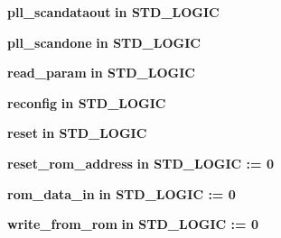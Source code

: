 \begin{DoxyCompactItemize}
\item 
{\bf pll\+\_\+scandataout}  {\bfseries {\bfseries \textcolor{keywordflow}{in}\textcolor{vhdlchar}{ }}} {\bfseries \textcolor{comment}{S\+T\+D\+\_\+\+L\+O\+G\+IC}\textcolor{vhdlchar}{ }} 
\item 
{\bf pll\+\_\+scandone}  {\bfseries {\bfseries \textcolor{keywordflow}{in}\textcolor{vhdlchar}{ }}} {\bfseries \textcolor{comment}{S\+T\+D\+\_\+\+L\+O\+G\+IC}\textcolor{vhdlchar}{ }} 
\item 
{\bf read\+\_\+param}  {\bfseries {\bfseries \textcolor{keywordflow}{in}\textcolor{vhdlchar}{ }}} {\bfseries \textcolor{comment}{S\+T\+D\+\_\+\+L\+O\+G\+IC}\textcolor{vhdlchar}{ }} 
\item 
{\bf reconfig}  {\bfseries {\bfseries \textcolor{keywordflow}{in}\textcolor{vhdlchar}{ }}} {\bfseries \textcolor{comment}{S\+T\+D\+\_\+\+L\+O\+G\+IC}\textcolor{vhdlchar}{ }} 
\item 
{\bf reset}  {\bfseries {\bfseries \textcolor{keywordflow}{in}\textcolor{vhdlchar}{ }}} {\bfseries \textcolor{comment}{S\+T\+D\+\_\+\+L\+O\+G\+IC}\textcolor{vhdlchar}{ }} 
\item 
{\bf reset\+\_\+rom\+\_\+address}  {\bfseries {\bfseries \textcolor{keywordflow}{in}\textcolor{vhdlchar}{ }}} {\bfseries \textcolor{comment}{S\+T\+D\+\_\+\+L\+O\+G\+IC}\textcolor{vhdlchar}{ }\textcolor{vhdlchar}{ }\textcolor{vhdlchar}{\+:}\textcolor{vhdlchar}{=}\textcolor{vhdlchar}{ }\textcolor{vhdlchar}{ }\textcolor{vhdlchar}{\textquotesingle{}}\textcolor{vhdlchar}{ } \textcolor{vhdldigit}{0} \textcolor{vhdlchar}{ }\textcolor{vhdlchar}{\textquotesingle{}}\textcolor{vhdlchar}{ }} 
\item 
{\bf rom\+\_\+data\+\_\+in}  {\bfseries {\bfseries \textcolor{keywordflow}{in}\textcolor{vhdlchar}{ }}} {\bfseries \textcolor{comment}{S\+T\+D\+\_\+\+L\+O\+G\+IC}\textcolor{vhdlchar}{ }\textcolor{vhdlchar}{ }\textcolor{vhdlchar}{\+:}\textcolor{vhdlchar}{=}\textcolor{vhdlchar}{ }\textcolor{vhdlchar}{ }\textcolor{vhdlchar}{\textquotesingle{}}\textcolor{vhdlchar}{ } \textcolor{vhdldigit}{0} \textcolor{vhdlchar}{ }\textcolor{vhdlchar}{\textquotesingle{}}\textcolor{vhdlchar}{ }} 
\item 
{\bf write\+\_\+from\+\_\+rom}  {\bfseries {\bfseries \textcolor{keywordflow}{in}\textcolor{vhdlchar}{ }}} {\bfseries \textcolor{comment}{S\+T\+D\+\_\+\+L\+O\+G\+IC}\textcolor{vhdlchar}{ }\textcolor{vhdlchar}{ }\textcolor{vhdlchar}{\+:}\textcolor{vhdlchar}{=}\textcolor{vhdlchar}{ }\textcolor{vhdlchar}{ }\textcolor{vhdlchar}{\textquotesingle{}}\textcolor{vhdlchar}{ } \textcolor{vhdldigit}{0} \textcolor{vhdlchar}{ }\textcolor{vhdlchar}{\textquotesingle{}}\textcolor{vhdlchar}{ }} 

\end{DoxyCompactItemize}
